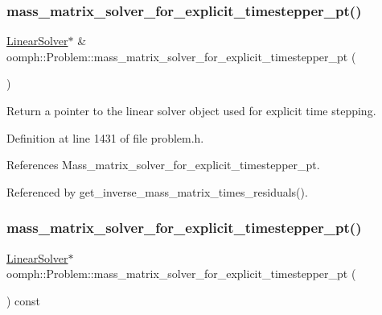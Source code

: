 \subsubsection{\texorpdfstring{mass\+\_\+matrix\+\_\+solver\+\_\+for\+\_\+explicit\+\_\+timestepper\+\_\+pt()}{mass\_matrix\_solver\_for\_explicit\_timestepper\_pt()}\hspace{0.1cm}{\footnotesize\ttfamily [1/2]}}
{\footnotesize\ttfamily \hyperlink{classoomph_1_1LinearSolver}{Linear\+Solver}$\ast$ \& oomph\+::\+Problem\+::mass\+\_\+matrix\+\_\+solver\+\_\+for\+\_\+explicit\+\_\+timestepper\+\_\+pt (\begin{DoxyParamCaption}{ }\end{DoxyParamCaption})\hspace{0.3cm}{\ttfamily [inline]}}

Return a pointer to the linear solver object used for explicit time stepping. 

Definition at line 1431 of file problem.\+h.



References Mass\+\_\+matrix\+\_\+solver\+\_\+for\+\_\+explicit\+\_\+timestepper\+\_\+pt.



Referenced by get\+\_\+inverse\+\_\+mass\+\_\+matrix\+\_\+times\+\_\+residuals().

\mbox{\label{classoomph_1_1Problem_a10ffcfbf305940a05452d950df7a11c3}} 
\subsubsection{\texorpdfstring{mass\+\_\+matrix\+\_\+solver\+\_\+for\+\_\+explicit\+\_\+timestepper\+\_\+pt()}{mass\_matrix\_solver\_for\_explicit\_timestepper\_pt()}\hspace{0.1cm}{\footnotesize\ttfamily [2/2]}}
{\footnotesize\ttfamily \hyperlink{classoomph_1_1LinearSolver}{Linear\+Solver}$\ast$ oomph\+::\+Problem\+::mass\+\_\+matrix\+\_\+solver\+\_\+for\+\_\+explicit\+\_\+timestepper\+\_\+pt (\begin{DoxyParamCaption}{ }\end{DoxyParamCaption}) const\hspace{0.3cm}{\ttfamily [inline]}}


